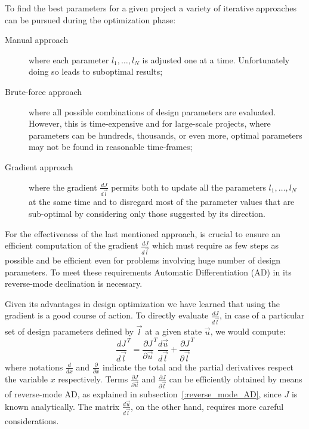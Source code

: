 To find the best parameters for a given project a variety of iterative approaches can be pursued during the optimization phase:
\begin{description}
	\item[Manual approach] where each parameter $l_1, \dots, l_N$ is adjusted one at a time. Unfortunately doing so leads to suboptimal results;
	\item[Brute-force approach] where all possible combinations of design parameters are evaluated. However, this is time-expensive and for large-scale projects, where parameters can be hundreds, thousands, or even more, optimal parameters may not be found in reasonable time-frames;
	\item[Gradient approach] where the gradient $\frac{dJ}{d\vec{l}}$ permits both to update all the parameters $l_1, \dots, l_N$ at the same time and to disregard most of the parameter values that are sub-optimal by considering only those suggested by its direction.
\end{description}
For the effectiveness of the last mentioned approach, is crucial to ensure an efficient computation of the gradient $\frac{dJ}{d\vec{l}}$ which must require as few steps as possible and be efficient even for problems involving huge number of design parameters. To meet these requirements Automatic Differentiation (AD) in its reverse-mode declination is necessary.

\bigskip
Given its advantages in design optimization we have learned that using the gradient is a good course of action. To directly evaluate $\frac{dJ}{d\vec{l}}$, in case of a particular set of design parameters defined by $\vec{l}$ at a given state $\vec{u}$, we would compute:
\begin{equation}
	\label{eqn:generic_gradient_design_opt}
	\frac{dJ}{d\vec{l}}^T = \frac{\partial J}{\partial \vec{u}}^T \frac{d\vec{u}}{d\vec{l}} + \frac{\partial J}{\partial \vec{l}}^T
\end{equation}
where notations $\frac{d}{dx}$ and $\frac{\partial}{\partial x}$ indicate the total and the partial derivatives respect the variable $x$ respectively.
Terms $\frac{\partial J}{\partial \vec{u}}$ and $\frac{\partial J}{\partial \vec{l}}$ can be efficiently obtained by means of reverse-mode AD, as explained in subsection~\vref{:reverse_mode_AD}, since $J$ is known analytically. The matrix $\frac{d\vec{u}}{d\vec{l}}$, on the other hand, requires more careful considerations.

